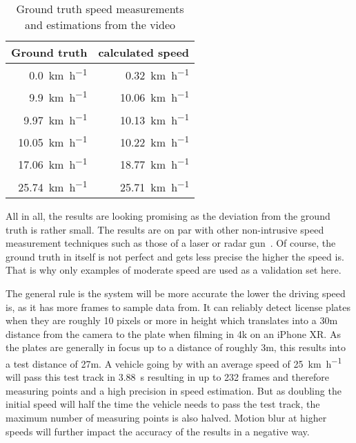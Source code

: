 \begin{table}[]
    \centering
    \begin{tabular}{|r|r|}
        \hline
        \multicolumn{1}{|l|}{Ground truth} & \multicolumn{1}{l|}{calculated speed} \\ \hline
        \SI{0.0}{\kilo\metre\per\hour}     & \SI{0.32}{\kilo\metre\per\hour}      \\
        \SI{9.9}{\kilo\metre\per\hour}     & \SI{10.06}{\kilo\metre\per\hour}      \\
        \SI{9.97}{\kilo\metre\per\hour}    & \SI{10.13}{\kilo\metre\per\hour}      \\
        \SI{10.05}{\kilo\metre\per\hour}   & \SI{10.22}{\kilo\metre\per\hour}      \\
        \SI{17.06}{\kilo\metre\per\hour}   & \SI{18.77}{\kilo\metre\per\hour}      \\
        \SI{25.74}{\kilo\metre\per\hour}   & \SI{25.71}{\kilo\metre\per\hour}      \\ \hline
    \end{tabular}
    \caption{Ground truth speed measurements \\and estimations from the video}
    \label{tab:speedEstimation}
\end{table}

All in all, the results are looking promising as the deviation from the ground truth is rather small.
The results are on par with other non-intrusive speed measurement techniques such as those of a laser or radar gun~\cite{Adnan2013}.
Of course, the ground truth in itself is not perfect and gets less precise the higher the speed is.
That is why only examples of moderate speed are used as a validation set here.

The general rule is the system will be more accurate the lower the driving speed is, as it has more frames to sample data from.
It can reliably detect license plates when they are roughly 10 pixels or more in height which translates into a 30m distance from the camera to the plate when filming in 4k on an iPhone XR.
As the plates are generally in focus up to a distance of roughly 3m, this results into a test distance of 27m.
A vehicle going by with an average speed of \SI{25}{\kilo\metre\per\hour} will pass this test track in \SI{3.88}{\second} resulting in up to 232 frames and therefore measuring points and a high precision in speed estimation.
But as doubling the initial speed will half the time the vehicle needs to pass the test track, the maximum number of measuring points is also halved.
Motion blur at higher speeds will further impact the accuracy of the results in a negative way.



